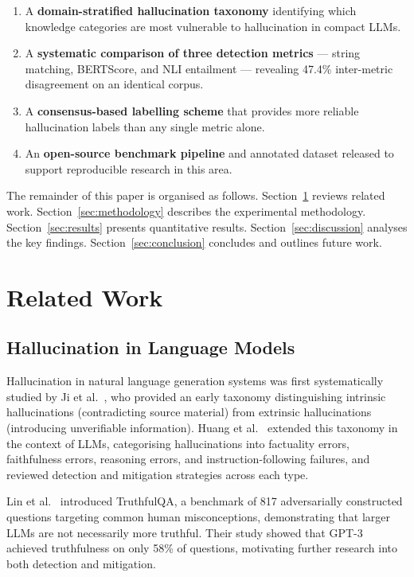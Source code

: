 \documentclass[conference]{IEEEtran}
\begin{document}
\begin{enumerate}
\item A \textbf{domain-stratified hallucination taxonomy}
  identifying which knowledge categories are most
  vulnerable to hallucination in compact LLMs.

\item A \textbf{systematic comparison of three detection
  metrics} — string matching, BERTScore, and NLI
  entailment — revealing 47.4\% inter-metric disagreement
  on an identical corpus.

\item A \textbf{consensus-based labelling scheme} that
  provides more reliable hallucination labels than any
  single metric alone.

\item An \textbf{open-source benchmark pipeline} and
  annotated dataset released to support reproducible
  research in this area.
\end{enumerate}

The remainder of this paper is organised as follows.
Section~\ref{sec:related} reviews related work.
Section~\ref{sec:methodology} describes the experimental
methodology.
Section~\ref{sec:results} presents quantitative results.
Section~\ref{sec:discussion} analyses the key findings.
Section~\ref{sec:conclusion} concludes and outlines
future work.
\section{Related Work}
\label{sec:related}

\subsection{Hallucination in Language Models}

Hallucination in natural language generation systems was first
systematically studied by Ji et al.~\cite{ji2023survey}, who
provided an early taxonomy distinguishing intrinsic
hallucinations (contradicting source material) from extrinsic
hallucinations (introducing unverifiable information).
Huang et al.~\cite{huang2023survey} extended this taxonomy in
the context of LLMs, categorising hallucinations into factuality
errors, faithfulness errors, reasoning errors, and
instruction-following failures, and reviewed detection and
mitigation strategies across each type.

Lin et al.~\cite{lin2022truthfulqa} introduced TruthfulQA, a
benchmark of 817 adversarially constructed questions targeting
common human misconceptions, demonstrating that larger LLMs
are not necessarily more truthful.
Their study showed that GPT-3 achieved truthfulness on only
58\% of questions, motivating further research into both
detection and mitigation.
\end{document}
